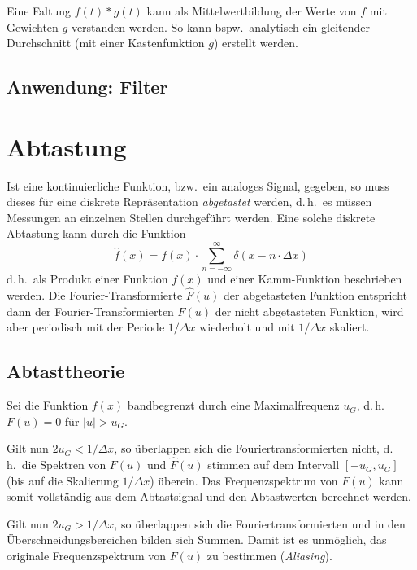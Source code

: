 \documentclass[a4paper, 11pt, accentcolor = tud3b]{tudreport}
\renewcommand{\dh}{d.\,h.~}
\newcommand{\bzw}{bzw.~}
\newcommand{\bspw}{bspw.~}
\begin{document}
			Eine Faltung \( f(t) \ast g(t) \) kann als Mittelwertbildung der Werte von \(f\) mit Gewichten \(g\) verstanden werden. So kann \bspw analytisch ein gleitender Durchschnitt (mit einer Kastenfunktion \(g\)) erstellt werden.
			
			\subsection{Anwendung: Filter} %

		\section{Abtastung}
			Ist eine kontinuierliche Funktion, \bzw ein analoges Signal, gegeben, so muss dieses für eine diskrete Repräsentation \emph{abgetastet} werden, \dh es müssen Messungen an einzelnen Stellen durchgeführt werden. Eine solche diskrete Abtastung kann durch die Funktion
			\begin{equation*}
				\hat{f}(x) = f(x) \cdot \sum_{n = -\infty}^{\infty} \delta(x - n \cdot \Delta x)
			\end{equation*}
			\dh als Produkt einer Funktion \( f(x) \) und einer Kamm-Funktion beschrieben werden. Die Fourier-Transformierte \( \hat{F}(u) \) der abgetasteten Funktion entspricht dann der Fourier-Transformierten \( F(u) \) der nicht abgetasteten Funktion, wird aber periodisch mit der Periode \( 1/\Delta x \) wiederholt und mit \( 1/\Delta x \) skaliert.

			\subsection{Abtasttheorie}
				Sei die Funktion \( f(x) \) bandbegrenzt durch eine Maximalfrequenz \( u_G \), \dh \( F(u) = 0 \) für \( \lvert u \rvert > u_G \).
				
				Gilt nun \( 2u_G < 1 / \Delta x \), so überlappen sich die Fouriertransformierten nicht, \dh die Spektren von \( F(u) \) und \( \hat{F}(u) \) stimmen auf dem Intervall \( [-u_G, u_G] \) (bis auf die Skalierung \( 1 / \Delta x \)) überein. Das Frequenzspektrum von \( F(u) \) kann somit vollständig aus dem Abtastsignal und den Abtastwerten berechnet werden.
				
				Gilt nun \( 2u_G > 1 / \Delta x \), so überlappen sich die Fouriertransformierten und in den Überschneidungsbereichen bilden sich Summen. Damit ist es unmöglich, das originale Frequenzspektrum von \( F(u) \) zu bestimmen (\emph{Aliasing}).
\end{document}
